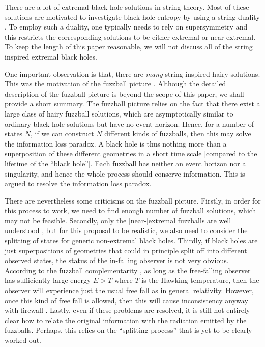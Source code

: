 \documentclass[12pt]{article}
\newcommand{\2}{$^2$}
\newcommand{\3}{$^3$}
\newcommand{\4}{$_4$}
\newcommand{\5}{$_5$}
\begin{document}
There are a lot of extremal black hole solutions in string theory. Most of these solutions are motivated to investigate black hole entropy by using a string duality \cite{Strominger:1996sh}. To employ such a duality, one typically needs to rely on supersymmetry and this restricts the corresponding solutions to be either extremal or near extremal. To keep the length of this paper reasonable, we will not discuss all of the string inspired extremal black holes.

One important observation is that, there are \emph{many} string-inspired hairy solutions. This was the motivation of the fuzzball picture \cite{Mathur:2005zp}. Although the detailed description of the fuzzball picture is beyond the scope of this paper, we shall provide a short summary. The fuzzball picture relies on the fact that there exist a large class of hairy fuzzball solutions, which are asymptotically similar to ordinary black hole solutions but have no event horizon. Hence, for a number of states $N$, if we can construct $N$ different kinds of fuzzballs, then this may solve the information loss paradox. A black hole is thus nothing more than a superposition of these different geometries in a short time scale [compared to the lifetime of the ``black hole'']. Each fuzzball has neither an event horizon nor a singularity, and hence the whole process should conserve information. This is argued to resolve the information loss paradox.

There are nevertheless  some criticisms on the fuzzball picture. Firstly, in order for this process to work, we need to find enough number of fuzzball solutions, which may not be feasible. Secondly, only the [near-]extremal fuzzballs are well understood \cite{1208.3468}, but for this proposal to be realistic, we also need to consider the splitting of states for generic non-extremal black holes. Thirdly, if  black holes are just superpositions of geometries that could in principle split off into different observed states, the status of the in-falling observer is not very obvious. According to the fuzzball complementarity \cite{Mathur:2012jk, Chowdhury:2012vd}, as long as the free-falling observer has sufficiently large energy $E > T$ where $T$ is the Hawking temperature, then the observer will experience just the usual free fall as in general relativity. However, once this kind of free fall is allowed, then this will cause inconsistency anyway with firewall \cite{apologia, Hwang:2012nn}. Lastly, even if these problems are resolved, it is still not entirely clear how to relate the original information with the radiation emitted by the fuzzballs. Perhaps, this relies on the ``splitting process'' that is yet to be clearly worked out.
\end{document}
